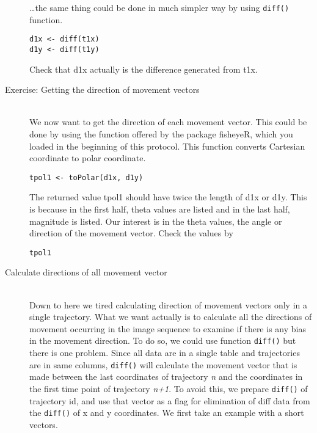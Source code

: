\documentclass[11pnt]{article}
\begin{document}
\begin{description}
\dots the same thing could be done in much simpler way by using \verb"diff()" function. 
\begin{verbatim}
d1x <- diff(t1x)
d1y <- diff(t1y)
\end{verbatim}

Check that d1x actually is the difference generated from t1x. 

\item[Exercise: Getting the direction of movement vectors]\hfill\\

We now want to get the direction of each movement vector. This could be done by using the function offered by the package fisheyeR, which you loaded in the beginning of this protocol. This function converts Cartesian coordinate to polar coordinate. 
\begin{verbatim}
tpol1 <- toPolar(d1x, d1y)
\end{verbatim}
The returned value tpol1 should have twice the length of d1x or d1y. This is because in the first half, theta values are listed and in the last half, magnitude is listed. Our interest is in the theta values, the angle or direction of the movement vector. Check the values by 
\begin{verbatim}
tpol1
\end{verbatim}

\item[Calculate directions of all movement vector]\hfill\\

Down to here we tired calculating direction of movement vectors only in a single trajectory. What we want actually is to calculate all the directions of movement occurring in the image sequence to examine if there is any bias in the movement direction. To do so, we could use function \verb"diff()" but there is one problem. Since all data are in a single table and trajectories are in same columns, \verb"diff()" will calculate the movement vector that is made between the last coordinates of trajectory \textit{n} and the coordinates in the first time point of trajectory \textit{n+1}. To avoid this, we prepare \verb"diff()" of trajectory id, and use that vector as a flag for elimination of diff data from the \verb"diff()" of x and y coordinates. We first take an example with a short vectors. 


\end{description}
\end{document}
